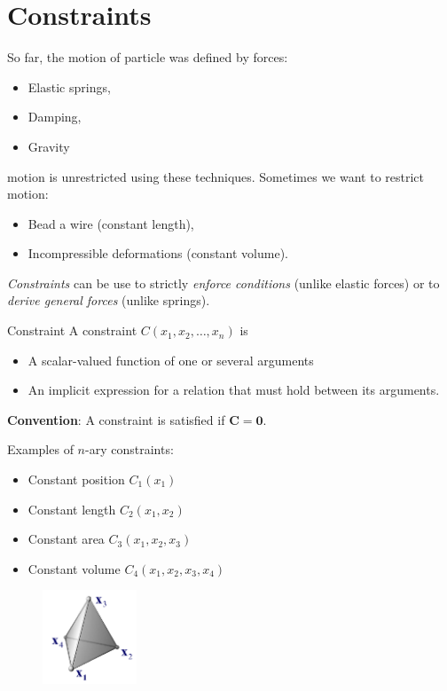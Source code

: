 \part{Constraints}
\begin{multicols}{2}
So far, the motion of particle was defined by forces:
\begin{itemize}
	\item Elastic springs,
	\item Damping,
	\item Gravity
\end{itemize}
motion is unrestricted using these techniques. Sometimes we want to restrict motion:
\begin{itemize}
	\item Bead a wire (constant length),
	\item Incompressible deformations (constant volume).
\end{itemize}
 \emph{Constraints} can be use to strictly \emph{enforce conditions} (unlike elastic forces) or to \emph{derive general forces} (unlike springs).

\begin{definition}{Constraint}
	A constraint $C(x_1, x_2, \ldots, x_n)$ is 
	\begin{itemize}
		\item A scalar-valued function of one or several arguments
		\item An implicit expression for a relation that must hold between its arguments.
	\end{itemize}

	\textbf{Convention}: A constraint is satisfied if $\mathbf{C=0}$.
\end{definition}
Examples of $n$-ary constraints:
\begin{itemize}
	\item Constant position $C_1(x_1)$
	\item Constant length $C_2(x_1, x_2)$
	\item Constant area $C_3(x_1, x_2, x_3)$
	\item Constant volume $C_4(x_1, x_2, x_3, x_4)$
\end{itemize}
\begin{figure}[H]
	\centering
	\includegraphics[width=0.25\textwidth]{img/02_tetra}
\end{figure}


\end{multicols}
